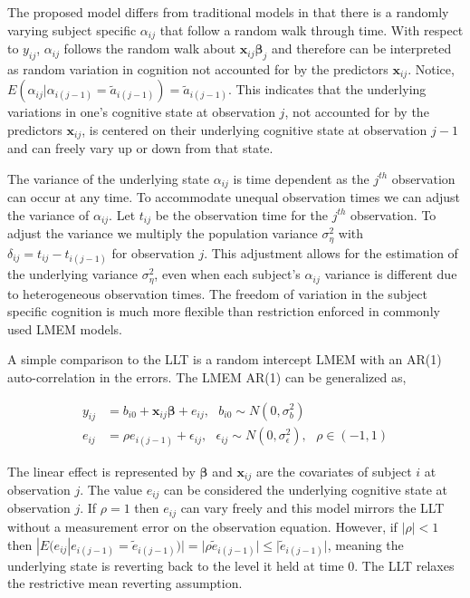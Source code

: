 \documentclass[
]{article}
\begin{document}
The proposed model differs from traditional models in that there is a randomly varying subject specific \(\alpha_{ij}\) that follow a random walk through time. With respect to \(y_{ij}\), \(\alpha_{ij}\) follows the random walk about \(\boldsymbol{x}_{ij} \boldsymbol{\beta}_j\) and therefore can be interpreted as random variation in cognition not accounted for by the predictors \(\boldsymbol{x}_{ij}\). Notice, \(E(\alpha_{ij}|\alpha_{i(j-1)} =\tilde a_{i(j-1)}) = \tilde a_{i(j-1)}\). This indicates that the underlying variations in one's cognitive state at observation \(j\), not accounted for by the predictors \(\boldsymbol{x}_{ij}\), is centered on their underlying cognitive state at observation \(j-1\) and can freely vary up or down from that state.

The variance of the underlying state \(\alpha_{ij}\) is time dependent as the \(j^{th}\) observation can occur at any time. To accommodate unequal observation times we can adjust the variance of \(\alpha_{ij}\). Let \(t_{ij}\) be the observation time for the \(j^{th}\) observation. To adjust the variance we multiply the population variance \(\sigma^2_\eta\) with \(\delta_{ij} = t_{ij} - t_{i(j-1)}\) for observation \(j\). This adjustment allows for the estimation of the underlying variance \(\sigma^2_\eta\), even when each subject's \(\alpha_{ij}\) variance is different due to heterogeneous observation times. The freedom of variation in the subject specific cognition is much more flexible than restriction enforced in commonly used LMEM models.

A simple comparison to the LLT is a random intercept LMEM with an AR(1) auto-correlation in the errors. The LMEM AR(1) can be generalized as,

\begin{equation*}
\begin{aligned}
y_{ij} &= b_{i0}+\boldsymbol{x}_{ij}\boldsymbol{\beta}  + e_{ij}, \ \ \ b_{i0}\sim N(0, \sigma^2_b)\\
e_{ij} &=\rho e_{i(j-1)} + \epsilon_{ij}, \ \ \ \epsilon_{ij}\sim N(0, \sigma^2_\epsilon), \ \ \ \rho \in (-1,1) 
\end{aligned}
\end{equation*}

The linear effect is represented by \(\boldsymbol{\beta}\) and \(\boldsymbol{x}_{ij}\) are the covariates of subject \(i\) at observation \(j\). The value \(e_{ij}\) can be considered the underlying cognitive state at observation \(j\). If \(\rho = 1\) then \(e_{ij}\) can vary freely and this model mirrors the LLT without a measurement error on the observation equation. However, if \(|\rho| < 1\) then \(|E(e_{ij}|e_{i(j-1)} = \tilde e_{i(j-1)})|= |\rho \tilde e_{i(j-1)}| \leq |\tilde e_{i(j-1)}|\), meaning the underlying state is reverting back to the level it held at time 0. The LLT relaxes the restrictive mean reverting assumption.
\end{document}
